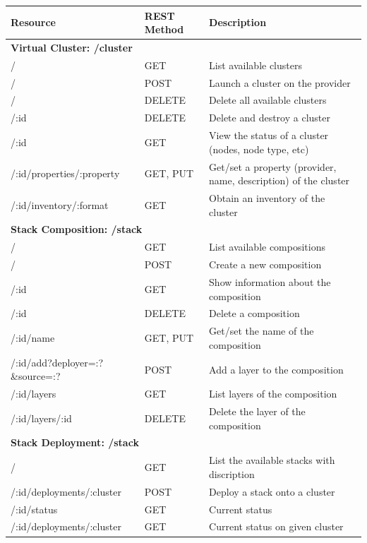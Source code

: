 \documentclass[9pt,twocolumn,twoside]{styles/osajnl}
\newcommand{\grey}{\cellcolor{lightgray}}  %
\newcommand{\blue}{\cellcolor{gray}}  %
\begin{document}
\begin{table}[htb]
  \bigskip
  \begin{center}
    \begin{small}
      \begin{tabular}{|l|l|l|}
        \hline
        \blue \textbf{Resource} & \blue \textbf{REST Method} & \blue \textbf{Description}\tabularnewline

\hline \multicolumn{3}{|l|}{\grey\bf Virtual Cluster: /cluster} \tabularnewline \hline
/                         & GET      & List available clusters \tabularnewline \hline
/                         & POST     & Launch a cluster on the provider \tabularnewline \hline
/                         & DELETE   & Delete all available clusters \tabularnewline \hline
/:id                      & DELETE   & Delete and destroy a cluster \tabularnewline \hline
/:id                      & GET      & View the status of a cluster (nodes, node type, etc) \tabularnewline \hline
/:id/properties/:property & GET, PUT & Get/set a property (provider, name, description) of the cluster \tabularnewline \hline
/:id/inventory/:format    & GET      & Obtain an inventory of the cluster \tabularnewline \hline

\hline \multicolumn{3}{|l|}{\grey\bf Stack Composition: /stack} \tabularnewline \hline
/                               & GET      & List available compositions \tabularnewline \hline
/                               & POST     & Create a new composition \tabularnewline \hline
/:id                            & GET      & Show information about the composition \tabularnewline \hline
/:id                            & DELETE   & Delete a composition \tabularnewline \hline
/:id/name                       & GET, PUT & Get/set the name of the composition \tabularnewline \hline
/:id/add?deployer=:?\&source=:? & POST     & Add a layer to the composition \tabularnewline \hline
/:id/layers                     & GET      & List layers of the composition \tabularnewline \hline
/:id/layers/:id                 & DELETE   & Delete the layer of the composition \tabularnewline \hline

\hline \multicolumn{3}{|l|}{\grey\bf Stack Deployment: /stack} \tabularnewline \hline
/                         & GET  & List the available stacks with discription \tabularnewline \hline
/:id/deployments/:cluster & POST & Deploy a stack onto a cluster \tabularnewline \hline
/:id/status               & GET  & Current status \tabularnewline \hline
/:id/deployments/:cluster & GET  & Current status on given cluster \tabularnewline \hline


\end{tabular}
\end{small}
\end{center}
\end{table}
\end{document}
